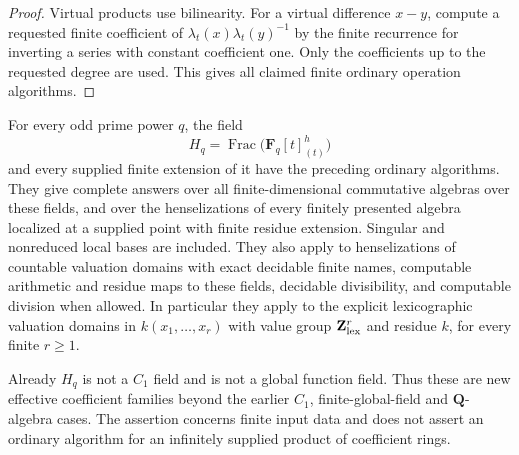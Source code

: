 \begin{proof}
Virtual products use bilinearity.
For a virtual difference $x-y$,
compute a requested finite
coefficient of
$\lambda_t(x)\lambda_t(y)^{-1}$
by the finite recurrence for
inverting a series with constant
coefficient one.
Only the coefficients up to
the requested degree are used.
This gives all claimed finite
ordinary operation algorithms.
\end{proof}

\begin{corollary}
\label{C:henselian-global-new-families}
For every odd prime power $q$, the field
\[
 H_q=\operatorname{Frac}
       \bigl(\mathbf F_q[t]_{(t)}^h\bigr)               \tag{C.3.HW5}
\]
and every supplied finite extension of it
have the preceding ordinary algorithms.
They give complete answers over all
finite-dimensional commutative algebras
over these fields, and over the
henselizations of every finitely presented
algebra localized at a supplied point
with finite residue extension.
Singular and nonreduced local bases
are included.
They also apply to henselizations
of countable valuation domains
with exact decidable finite names,
computable arithmetic and residue
maps to these fields, decidable
divisibility, and computable division
when allowed.  In particular they
apply to
the explicit lexicographic valuation
domains in $k(x_1,\ldots,x_r)$ with
value group $\mathbf Z^r_{\rm lex}$
and residue $k$, for every finite $r\ge1$.

Already $H_q$ is not a $C_1$ field
and is not a global function field.
Thus these are new effective coefficient
families beyond the earlier $C_1$,
finite-global-field and $\mathbf Q$-algebra
cases.  The assertion concerns finite
input data and does not assert an
ordinary algorithm for an infinitely
supplied product of coefficient rings.
\end{corollary}
